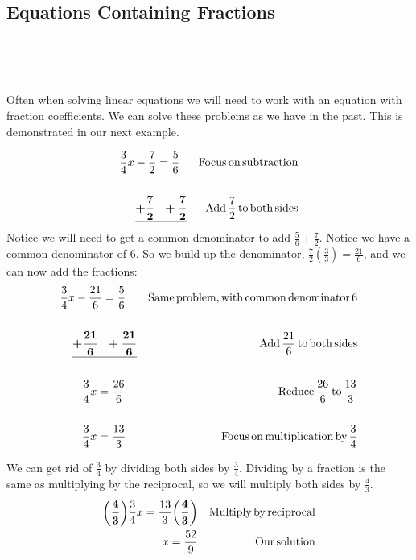 \subsection{Equations Containing Fractions}\par
~\par
{}\par
~\par
 Often when solving linear equations we will need to work with an equation with
fraction coefficients. We can solve these problems as we have in the past.
This is demonstrated in our next example.

\begin{example}\label{Lin29}
	
  \begin{eqnarray*}
    \frac{3}{4} x - \frac{7}{2} = \frac{5}{6}~~ &  & \operatorname{Focus} \operatorname{on}
    \operatorname{subtraction}\\
    &  & \\
    \underline{\boldsymbol{+ \frac{7}{2} ~~+ \frac{7}{2}}} &  & \operatorname{Add}
    \frac{7}{2} \operatorname{to} \operatorname{both} \operatorname{sides}
  \end{eqnarray*}
   Notice we will need to get a common denominator to add $\frac{5}{6} +
  \frac{7}{2}$. Notice we have a common denominator of $6$. So we build up the
  denominator, $\frac{7}{2} \left( \frac{3}{3} \right) = \frac{21}{6}$, and we
  can now add the fractions:
  \begin{eqnarray*}
    \frac{3}{4} x - \frac{21}{6} = \frac{5}{6}~~~ &  & \operatorname{Same}
    \operatorname{problem}, \operatorname{with} \operatorname{common} \operatorname{denominator} 6\\
    &  & \\
    \boldsymbol{\underline{+ \frac{21}{6} ~~+ \frac{21}{6}}} &  & \operatorname{Add}
    \frac{21}{6} \operatorname{to} \operatorname{both} \operatorname{sides}\\
    &  & \\
    \frac{3}{4} x = \frac{26}{6}~~~ &  & \operatorname{Reduce} \frac{26}{6} \operatorname{to}
    \frac{13}{3}\\
    &  & \\
    \frac{3}{4} x = \frac{13}{3}~~~ &  & \operatorname{Focus} \operatorname{on}
    \operatorname{multiplication} \operatorname{by} \frac{3}{4}
  \end{eqnarray*}

   We can get rid of $\frac{3}{4}$ by dividing both sides by $\frac{3}{4}$.\pp
  Dividing by a fraction is the same as multiplying by the reciprocal, so we
  will multiply both sides by $\frac{4}{3}$.
  \begin{eqnarray*}
    \boldsymbol{\left( \frac{4}{3} \right)} \frac{3}{4} x = \frac{13}{3}
    \boldsymbol{\left( \frac{4}{3} \right)} &  & \operatorname{Multiply} \operatorname{by}
    \operatorname{reciprocal}\\
    x = \frac{52}{9}  &  & \operatorname{Our} \operatorname{solution}
  \end{eqnarray*}
\end{example}

